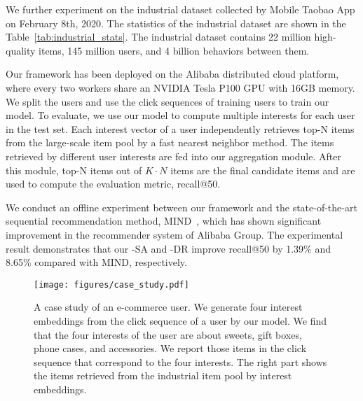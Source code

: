 

We further experiment on the industrial dataset collected by Mobile Taobao App on February 8th, 2020. The statistics of the industrial dataset are shown in the Table~\ref{tab:industrial_stats}. The industrial dataset contains 22 million high-quality items, 145 million users, and 4 billion behaviors between them. %

Our framework has been deployed on the Alibaba distributed cloud platform, where every two workers share an NVIDIA Tesla P100 GPU with 16GB memory. We split the users and use the click sequences of training users to train our model. To evaluate, we use our model to compute multiple interests for each user in the test set. Each interest vector of a user independently retrieves top-N items from the large-scale item pool by a fast nearest neighbor method. The items retrieved by different user interests are fed into our aggregation module. After this module, top-N items out of $K\cdot N$ items are the final candidate items and are used to compute the evaluation metric, recall@50. 

We conduct an offline experiment between our framework and the state-of-the-art sequential recommendation method, MIND~\cite{li2019multi}, which has shown significant improvement in the recommender system of Alibaba Group. The experimental result demonstrates that our \model-SA and \model-DR improve recall@50 by 1.39\% and 8.65\% compared with MIND, respectively.

\begin{figure}
    \centering
    \texttt{[image: figures/case\_study.pdf]}
    \caption{A case study of an e-commerce user. We generate four interest embeddings from the click sequence of a user by our model. We find that the four interests of the user are about sweets, gift boxes, phone cases, and accessories. We report those items in the click sequence that correspond to the four interests. The right part shows the items retrieved from the industrial item pool by interest embeddings. }
    \label{fig:case_study_interests}
\end{figure}


